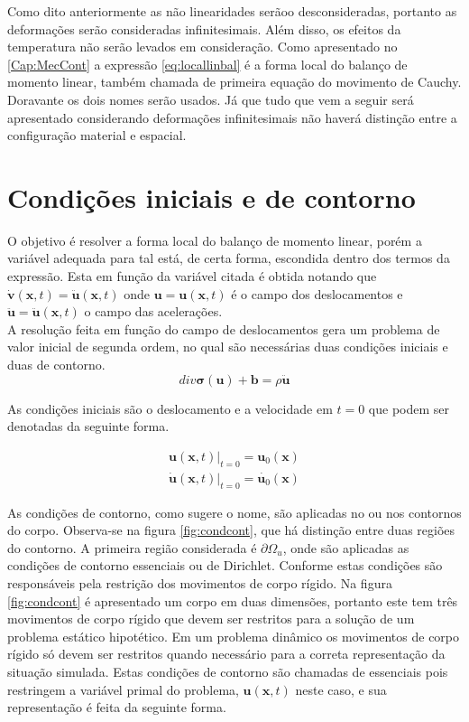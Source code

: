 Como dito anteriormente as não linearidades serãoo desconsideradas, portanto as deformações serão consideradas infinitesimais. Além disso, os efeitos da temperatura não serão levados em consideração. Como apresentado no \ref{Cap:MecCont} a expressão \ref{eq:locallinbal} é a forma local do balanço de momento linear, também chamada de primeira equação do movimento de Cauchy. Doravante os dois nomes serão usados. Já que tudo que vem a seguir será apresentado considerando deformações infinitesimais não haverá distinção entre a configuração material e espacial. 

\section{Condições iniciais e de contorno}

O objetivo é resolver a forma local do balanço de momento linear, porém a variável adequada para tal está, de certa forma, escondida dentro dos termos da expressão. Esta em função da variável citada é obtida notando que $ \dot{\boldsymbol{v}}(\boldsymbol{x},t) = \ddot{\boldsymbol{u}}(\boldsymbol{x},t) $ onde $ \boldsymbol{u} = \boldsymbol{u}(\boldsymbol{x},t)$ é o campo dos deslocamentos e $ \ddot{\boldsymbol{u}} = \ddot{\boldsymbol{u}} (\boldsymbol{x},t) $ o campo das acelerações. \\ A resolução feita em função do campo de deslocamentos gera um problema de valor inicial de segunda ordem, no qual são necessárias duas condições iniciais e duas de contorno.\\

\begin{equation}
	div\boldsymbol{\sigma(\boldsymbol{u})} + \boldsymbol{b} = \rho \ddot{\boldsymbol{u}}
\end{equation}

As condições iniciais são o deslocamento e a velocidade em $ t = 0 $ que podem ser denotadas da seguinte forma.

\begin{align} 
	\boldsymbol{u}(\boldsymbol{x},t)|_{t=0} = \boldsymbol{u}_{0}(\boldsymbol{x}) \\
	\dot{\boldsymbol{u}}(\boldsymbol{x},t)|_{t=0} = \dot{\boldsymbol{u}_{0}}(\boldsymbol{x})
\end{align} 

As condições de contorno, como sugere o nome, são aplicadas no ou nos contornos do corpo. Observa-se na figura \ref{fig:condcont}, que há distinção entre duas regiões do contorno. A primeira região considerada é $ \partial \Omega_u $, onde são aplicadas as condições de contorno essenciais ou de Dirichlet. Conforme \cite{Paulo} estas condições são responsáveis pela restrição dos movimentos de corpo rígido. Na figura \ref{fig:condcont} é apresentado um corpo em duas dimensões, portanto este tem três movimentos de corpo rígido que devem ser restritos para a solução de um problema estático hipotético. Em um problema dinâmico os movimentos de corpo rígido só devem ser restritos quando necessário para a correta representação da situação simulada. Estas condições de contorno são chamadas de essenciais pois restringem a variável primal do problema, $ \boldsymbol{u}(\boldsymbol{x},t) $ neste caso, e sua representação é feita da seguinte forma.


